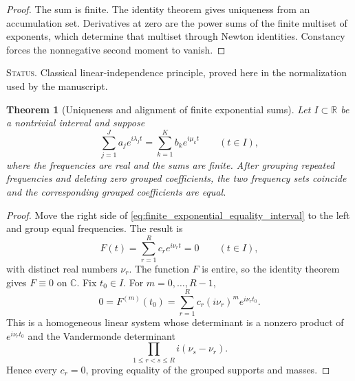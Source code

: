 \documentclass[11pt]{amsart}
\numberwithin{equation}{section}
\theoremstyle{plain}
\newtheorem{theorem}{Theorem}[section]
\theoremstyle{definition}
\theoremstyle{remark}
\newcommand{\1}{\mathbf{1}}
\newcommand{\statusnote}[1]{%
  \par\smallskip\noindent
  \begingroup\footnotesize\textsc{Status.} #1\endgroup
  \par\smallskip}
\begin{document}
\begin{proof}
The sum is finite.  The identity theorem gives uniqueness from an
accumulation set.  Derivatives at zero are the power sums of the finite
multiset of exponents, which determine that multiset through Newton
identities.  Constancy forces the nonnegative second moment to vanish.
\end{proof}

\statusnote{Classical linear-independence principle, proved here in the normalization used by the manuscript.}
\begin{theorem}[Uniqueness and alignment of finite exponential sums]
\label{thm:finite_exponential_alignment}
Let \(I\subset\mathbb R\) be a nontrivial interval and suppose
\begin{equation}
\sum_{j=1}^{J}a_je^{i\lambda_jt}
=
\sum_{k=1}^{K}b_ke^{i\mu_kt}
\qquad(t\in I),
\label{eq:finite_exponential_equality_interval}
\end{equation}
where the frequencies are real and the sums are finite.  After grouping
repeated frequencies and deleting zero grouped coefficients, the two
frequency sets coincide and the corresponding grouped coefficients are
equal.
\end{theorem}

\begin{proof}
Move the right side of
\eqref{eq:finite_exponential_equality_interval} to the left and group equal
frequencies.  The result is
\begin{equation}
F(t)=\sum_{r=1}^{R}c_re^{i\nu_rt}=0
\qquad(t\in I),
\label{eq:finite_exponential_difference}
\end{equation}
with distinct real numbers \(\nu_r\).  The function \(F\) is entire, so the
identity theorem gives \(F\equiv0\) on \(\mathbb C\).  Fix
\(t_0\in I\).  For \(m=0,\ldots,R-1\),
\begin{equation}
0=F^{(m)}(t_0)
=
\sum_{r=1}^{R}c_r(i\nu_r)^me^{i\nu_rt_0}.
\label{eq:finite_exponential_derivatives}
\end{equation}
This is a homogeneous linear system whose determinant is a nonzero product
of \(e^{i\nu_rt_0}\) and the Vandermonde determinant
\begin{equation}
\prod_{1\leq r<s\leq R}i(\nu_s-\nu_r).
\label{eq:finite_exponential_vandermonde}
\end{equation}
Hence every \(c_r=0\), proving equality of the grouped supports and masses.
\end{proof}
\end{document}
